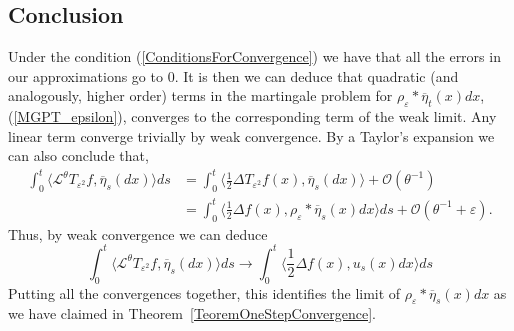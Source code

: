 \documentclass[a4paper,12pt]{article}
\newcommand{\1}{{\bf {1}}}
\def\epsilon{\varepsilon}
\begin{document}
\subsection{Conclusion}
Under the condition (\ref{ConditionsForConvergence}) we have that all the errors in our approximations go to $0$. It is then we can deduce that quadratic (and analogously, higher order) terms in the martingale problem for $\rho_\epsilon*\overline{\eta}_t(x)dx$, (\ref{MGPT_epsilon}), converges to the corresponding term of the weak limit. Any linear term converge trivially by weak convergence. By a Taylor's expansion we can also conclude that,
\begin{align*}
\int_0^t \langle \mathcal{L}^\theta T_{\epsilon^2} f, \overline{\eta}_s(dx)\rangle ds &= \int_0^t \langle \frac{1}{2} \Delta T_{\epsilon^2} f(x), \overline{\eta}_s(dx) \rangle + \mathcal{O}(\theta^{-1}) 
\\ &= \int_0^t \langle \frac{1}{2} \Delta f(x), \rho_\epsilon* \overline{\eta}_s(x) dx \rangle ds + \mathcal{O}(\theta^{-1} + \epsilon).
\end{align*}
Thus, by weak convergence we can deduce
\[ \int_0^t \langle \mathcal{L}^\theta T_{\epsilon^2} f, \overline{\eta}_s(dx)\rangle ds \rightarrow \int_0^t \langle \frac{1}{2} \Delta f(x), u_s(x) dx \rangle ds \]
Putting all the convergences together, this identifies the limit of $\rho_\epsilon*\overline{\eta}_s(x)dx$ as we have claimed in Theorem~\ref{TeoremOneStepConvergence}.
\end{document}
